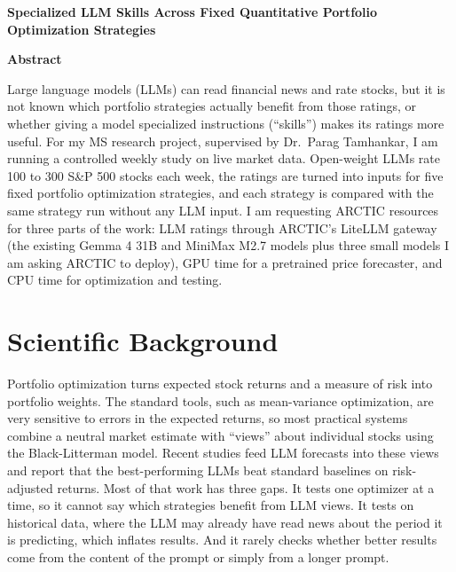 \documentclass[11pt,letterpaper]{article}
\begin{document}
\begin{center}
{\bfseries Specialized LLM Skills Across Fixed Quantitative Portfolio Optimization Strategies}
\end{center}

\textbf{Abstract}

Large language models (LLMs) can read financial news and rate stocks, but it is not known which portfolio strategies actually benefit from those ratings, or whether giving a model specialized instructions (``skills'') makes its ratings more useful. For my MS research project, supervised by Dr.\ Parag Tamhankar, I am running a controlled weekly study on live market data. Open-weight LLMs rate 100 to 300 S\&P 500 stocks each week, the ratings are turned into inputs for five fixed portfolio optimization strategies, and each strategy is compared with the same strategy run without any LLM input. I am requesting ARCTIC resources for three parts of the work: LLM ratings through ARCTIC's LiteLLM gateway (the existing Gemma 4 31B and MiniMax M2.7 models plus three small models I am asking ARCTIC to deploy), GPU time for a pretrained price forecaster, and CPU time for optimization and testing.

\section{Scientific Background}
Portfolio optimization turns expected stock returns and a measure of risk into portfolio weights. The standard tools, such as mean-variance optimization, are very sensitive to errors in the expected returns, so most practical systems combine a neutral market estimate with ``views'' about individual stocks using the Black-Litterman model. Recent studies feed LLM forecasts into these views and report that the best-performing LLMs beat standard baselines on risk-adjusted returns. Most of that work has three gaps. It tests one optimizer at a time, so it cannot say which strategies benefit from LLM views. It tests on historical data, where the LLM may already have read news about the period it is predicting, which inflates results. And it rarely checks whether better results come from the content of the prompt or simply from a longer prompt.
\end{document}
